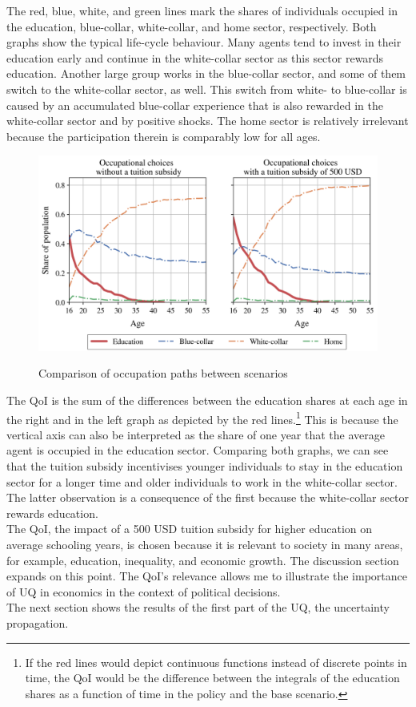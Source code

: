 \documentclass[a4paper,12pt]{article}
\begin{document}
The red, blue, white, and green lines mark the shares of individuals occupied in the education, blue-collar, white-collar, and home sector, respectively. Both graphs show the typical life-cycle behaviour. Many agents tend to invest in their education early and continue in the white-collar sector as this sector rewards education. Another large group works in the blue-collar sector, and some of them switch to the white-collar sector, as well. This switch from white- to blue-collar is caused by an accumulated blue-collar experience that is also rewarded in the white-collar sector and by positive shocks. The home sector is relatively irrelevant because the participation therein is comparably low for all ages.
\begin{figure}[H]
	\caption{Comparison of occupation paths between scenarios}
	\centering
	\includegraphics[scale=0.75]{../../../figures/occ_paths}
	\label{fig:paths}
\end{figure}
\noindent
The QoI is the sum of the differences between the education shares at each age in the right and in the left graph as depicted by the red lines.\footnote{If the red lines would depict continuous functions instead of discrete points in time, the QoI would be the difference between the integrals of the education shares as a function of time in the policy and the base scenario.} This is because the vertical axis can also be interpreted as the share of one year that the average agent is occupied in the education sector. Comparing both graphs, we can see that the tuition subsidy incentivises younger individuals to stay in the education sector for a longer time and older individuals to work in the white-collar sector. The latter observation is a consequence of the first because the white-collar sector rewards education.\\
\newline
The QoI, the impact of a 500 USD tuition subsidy for higher education on average schooling years, is chosen because it is relevant to society in many areas, for example, education, inequality, and economic growth. The discussion section expands on this point. The QoI's relevance allows me to illustrate the importance of UQ in economics in the context of political decisions.\\
\newline
The next section shows the results of the first part of the UQ, the uncertainty propagation.
\end{document}
